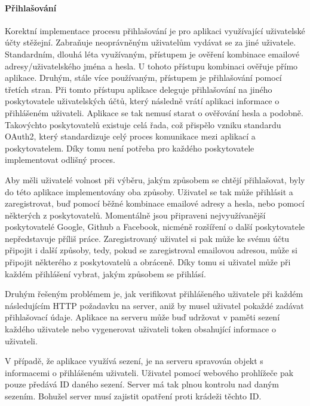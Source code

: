 			\paragraph{Přihlašování}

			Korektní implementace procesu přihlašování je pro aplikaci využívající uživatelské účty stěžejní.
			Zabraňuje neoprávněným uživatelům vydávat se za jiné uživatele.
			Standardním, dlouhá léta využívaným, přístupem je ověření kombinace emailové adresy/uživatelského jména
			a hesla.
			U tohoto přístupu kombinaci ověřuje přímo aplikace.
			Druhým, stále více používaným, přístupem je přihlašování pomocí třetích stran.
			Při tomto přístupu aplikace deleguje přihlašování na jiného poskytovatele uživatelských účtů, který následně
			vrátí aplikaci informace o přihlášeném uživateli.
			Aplikace se tak nemusí starat o ověřování hesla a podobně.
			Takovýchto poskytovatelů existuje celá řada, což přispělo vzniku standardu OAuth2, který standardizuje celý proces
			komunikace mezi aplikací a poskytovatelem.
			Díky tomu není potřeba pro každého poskytovatele implementovat odlišný proces.

			Aby měli uživatelé volnost při výběru, jakým způsobem se chtějí přihlašovat, byly do této aplikace implementovány
			oba způsoby.
			Uživatel se tak může přihlásit a zaregistrovat, buď pomocí běžné kombinace emailové adresy a hesla, nebo pomocí
			některých z poskytovatelů.
			Momentálně jsou připraveni nejvyužívanější poskytovatelé Google, Github a Facebook, nicméně rozšíření o
			další poskytovatele nepředstavuje příliš práce.
			Zaregistrovaný uživatel si pak může ke svému účtu připojit i další způsoby, tedy, pokud se zaregistroval emailovou
			adresou, může si připojit některého z poskytovatelů a obráceně.
			Díky tomu si uživatel může při každém přihlášení vybrat, jakým způsobem se přihlásí.

			Druhým řešeným problémem je, jak verifikovat přihlášeného uživatele při každém následujícím \ac{HTTP} požadavku na server,
			aniž by musel uživatel pokaždé zadávat přihlašovací údaje.
			Aplikace na serveru může buď udržovat v paměti sezení každého uživatele nebo vygenerovat uživateli token
			obsahující informace o uživateli.

			V případě, že aplikace využívá sezení, je na serveru spravován objekt s informacemi o přihlášeném uživateli.
			Uživatel pomocí webového prohlížeče pak pouze předává ID daného sezení.
			Server má tak plnou kontrolu nad daným sezením.
			Bohužel server musí zajistit opatření proti krádeži těchto ID.

